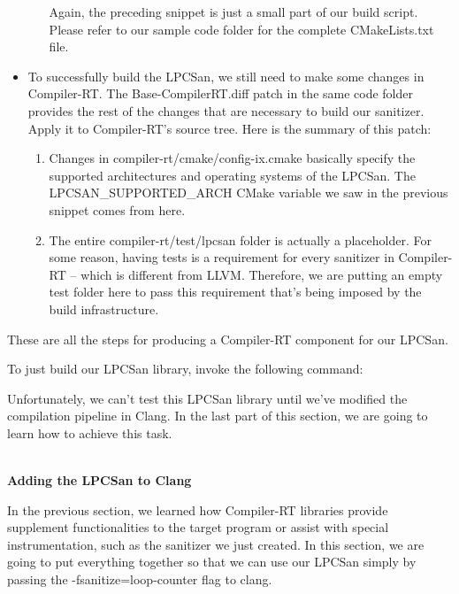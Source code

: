 \begin{itemize}
\begin{enumerate}[label=\roman*.]
Again, the preceding snippet is just a small part of our build script. Please refer to our sample code folder for the complete CMakeLists.txt file.
\end{enumerate}

\item To successfully build the LPCSan, we still need to make some changes in Compiler-RT. The Base-CompilerRT.diff patch in the same code folder provides the rest of the changes that are necessary to build our sanitizer. Apply it to Compiler-RT's source tree. Here is the summary of this patch:

\begin{enumerate}[label=\roman*.]
\item Changes in compiler-rt/cmake/config-ix.cmake basically specify the supported architectures and operating systems of the LPCSan. The LPCSAN\_SUPPORTED\_ARCH CMake variable we saw in the previous snippet comes from here.

\item The entire compiler-rt/test/lpcsan folder is actually a placeholder. For some reason, having tests is a requirement for every sanitizer in Compiler-RT – which is different from LLVM. Therefore, we are putting an empty test folder here to pass this requirement that's being imposed by the build infrastructure.
\end{enumerate}

\end{itemize}

These are all the steps for producing a Compiler-RT component for our LPCSan.

To just build our LPCSan library, invoke the following command:


Unfortunately, we can't test this LPCSan library until we've modified the compilation pipeline in Clang. In the last part of this section, we are going to learn how to achieve this task.

\hspace*{\fill} \\ %
\noindent
\textbf{Adding the LPCSan to Clang}

In the previous section, we learned how Compiler-RT libraries provide supplement functionalities to the target program or assist with special instrumentation, such as the sanitizer we just created. In this section, we are going to put everything together so that we can use our LPCSan simply by passing the -fsanitize=loop-counter flag to clang.

